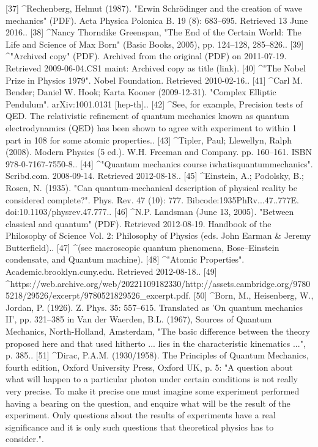 [37]
^Rechenberg, Helmut (1987). "Erwin Schrödinger and the creation of wave mechanics" (PDF). Acta Physica Polonica B. 19 (8): 683–695. Retrieved 13 June 2016..
[38]
^Nancy Thorndike Greenspan, "The End of the Certain World: The Life and Science of Max Born" (Basic Books, 2005), pp. 124–128, 285–826..
[39]
^"Archived copy" (PDF). Archived from the original (PDF) on 2011-07-19. Retrieved 2009-06-04.CS1 maint: Archived copy as title (link).
[40]
^"The Nobel Prize in Physics 1979". Nobel Foundation. Retrieved 2010-02-16..
[41]
^Carl M. Bender; Daniel W. Hook; Karta Kooner (2009-12-31). "Complex Elliptic Pendulum". arXiv:1001.0131 [hep-th]..
[42]
^See, for example, Precision tests of QED. The relativistic refinement of quantum mechanics known as quantum electrodynamics (QED) has been shown to agree with experiment to within 1 part in 108 for some atomic properties..
[43]
^Tipler, Paul; Llewellyn, Ralph (2008). Modern Physics (5 ed.). W.H. Freeman and Company. pp. 160–161. ISBN 978-0-7167-7550-8..
[44]
^"Quantum mechanics course iwhatisquantummechanics". Scribd.com. 2008-09-14. Retrieved 2012-08-18..
[45]
^Einstein, A.; Podolsky, B.; Rosen, N. (1935). "Can quantum-mechanical description of physical reality be considered complete?". Phys. Rev. 47 (10): 777. Bibcode:1935PhRv...47..777E. doi:10.1103/physrev.47.777..
[46]
^N.P. Landsman (June 13, 2005). "Between classical and quantum" (PDF). Retrieved 2012-08-19. Handbook of the Philosophy of Science Vol. 2: Philosophy of Physics (eds. John Earman & Jeremy Butterfield)..
[47]
^(see macroscopic quantum phenomena, Bose–Einstein condensate, and Quantum machine).
[48]
^"Atomic Properties". Academic.brooklyn.cuny.edu. Retrieved 2012-08-18..
[49]
^https://web.archive.org/web/20221109182330/http://assets.cambridge.org/97805218/29526/excerpt/9780521829526_excerpt.pdf.
[50]
^Born, M., Heisenberg, W., Jordan, P. (1926). Z. Phys. 35: 557–615. Translated as 'On quantum mechanics II', pp. 321–385 in Van der Waerden, B.L. (1967), Sources of Quantum Mechanics, North-Holland, Amsterdam, "The basic difference between the theory proposed here and that used hitherto ... lies in the characteristic kinematics ...", p. 385..
[51]
^Dirac, P.A.M. (1930/1958). The Principles of Quantum Mechanics, fourth edition, Oxford University Press, Oxford UK, p. 5: "A question about what will happen to a particular photon under certain conditions is not really very precise. To make it precise one must imagine some experiment performed having a bearing on the question, and enquire what will be the result of the experiment. Only questions about the results of experiments have a real significance and it is only such questions that theoretical physics has to consider.".
